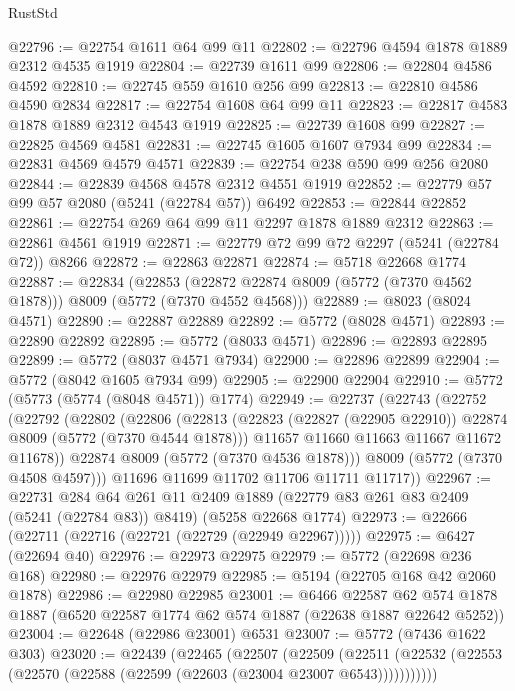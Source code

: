 \begin{lexlean}{RustStd}
\begin{coremodule}
{\begin{coremodule}
{{{{{{{{{{{{{{{{{{{{{{{{{{{{{@22796 := @22754 @1611 @64 @99 @11
@22802 := @22796 @4594 @1878 @1889 @2312 @4535 @1919
@22804 := @22739 @1611 @99
@22806 := @22804 @4586 @4592
@22810 := @22745 @559 @1610 @256 @99
@22813 := @22810 @4586 @4590 @2834
@22817 := @22754 @1608 @64 @99 @11
@22823 := @22817 @4583 @1878 @1889 @2312 @4543 @1919
@22825 := @22739 @1608 @99
@22827 := @22825 @4569 @4581
@22831 := @22745 @1605 @1607 @7934 @99
@22834 := @22831 @4569 @4579 @4571
@22839 := @22754 @238 @590 @99 @256 @2080
@22844 := @22839 @4568 @4578 @2312 @4551 @1919
@22852 := @22779 @57 @99 @57 @2080 (@5241 (@22784 @57)) @6492
@22853 := @22844 @22852
@22861 := @22754 @269 @64 @99 @11 @2297 @1878 @1889 @2312
@22863 := @22861 @4561 @1919
@22871 := @22779 @72 @99 @72 @2297 (@5241 (@22784 @72)) @8266
@22872 := @22863 @22871
@22874 := @5718 @22668 @1774
@22887 := @22834
    (@22853 (@22872 @22874 @8009 (@5772 (@7370 @4562 @1878))) @8009 (@5772 (@7370 @4552 @4568)))
@22889 := @8023 (@8024 @4571)
@22890 := @22887 @22889
@22892 := @5772 (@8028 @4571)
@22893 := @22890 @22892
@22895 := @5772 (@8033 @4571)
@22896 := @22893 @22895
@22899 := @5772 (@8037 @4571 @7934)
@22900 := @22896 @22899
@22904 := @5772 (@8042 @1605 @7934 @99)
@22905 := @22900 @22904
@22910 := @5772 (@5773 (@5774 (@8048 @4571)) @1774)
@22949 := @22737
    (@22743
      (@22752
        (@22792
          (@22802
            (@22806
              (@22813
                (@22823 (@22827 (@22905 @22910)) @22874 @8009 (@5772 (@7370 @4544 @1878)))
                @11657
                @11660
                @11663
                @11667
                @11672
                @11678))
            @22874
            @8009
            (@5772 (@7370 @4536 @1878)))
          @8009
          (@5772 (@7370 @4508 @4597)))
        @11696
        @11699
        @11702
        @11706
        @11711
        @11717))
@22967 := @22731
    @284
    @64
    @261
    @11
    @2409
    @1889
    (@22779 @83 @261 @83 @2409 (@5241 (@22784 @83)) @8419)
    (@5258 @22668 @1774)
@22973 := @22666 (@22711 (@22716 (@22721 (@22729 (@22949 @22967)))))
@22975 := @6427 (@22694 @40)
@22976 := @22973 @22975
@22979 := @5772 (@22698 @236 @168)
@22980 := @22976 @22979
@22985 := @5194 (@22705 @168 @42 @2060 @1878)
@22986 := @22980 @22985
@23001 := @6466
    @22587
    @62
    @574
    @1878
    @1887
    (@6520 @22587 @1774 @62 @574 @1887 (@22638 @1887 @22642 @5252))
@23004 := @22648 (@22986 @23001) @6531
@23007 := @5772 (@7436 @1622 @303)
@23020 := @22439
    (@22465
      (@22507
        (@22509
          (@22511 (@22532 (@22553 (@22570 (@22588 (@22599 (@22603 (@23004 @23007 @6543)))))))))))
}}}}}}}}}}}}}}}}}}}}}}}}}}}}}
\end{coremodule}}
\end{coremodule}
\end{lexlean}
